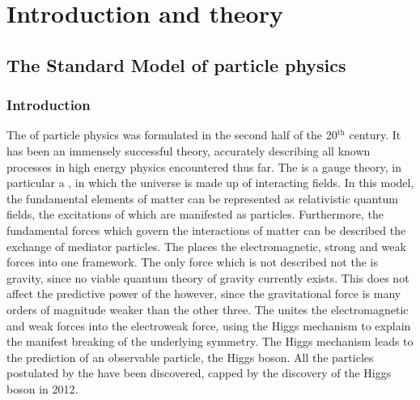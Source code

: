 \chapter{Introduction and theory}
\label{chap:theory}

\section{The Standard Model of particle physics}
\subsection{Introduction}

The \SM of particle physics was formulated in the second half of the 20$^{\text{th}}$ century. It has been an immensely successful theory, accurately describing all known processes in high energy physics encountered thus far. The \SM is a gauge theory, in particular a \QFT, in which the universe is made up of interacting fields. In this model, the fundamental elements of matter can be represented as relativistic quantum fields, the excitations of which are manifested as particles. Furthermore, the fundamental forces which govern the interactions of matter can be described the exchange of mediator particles. The \SM places the electromagnetic, strong and weak forces into one framework. The only force which is not described not the \SM is gravity, since no viable quantum theory of gravity currently exists. This does not affect the predictive power of the \SM however, since the gravitational force is many orders of magnitude weaker than the other three. The \SM unites the electromagnetic and weak forces into the electroweak force, using the Higgs mechanism to explain the manifest breaking of the underlying symmetry. The Higgs mechanism leads to the prediction of an observable particle, the Higgs boson. All the particles postulated by the \SM have been discovered, capped by the discovery of the Higgs boson in 2012.


